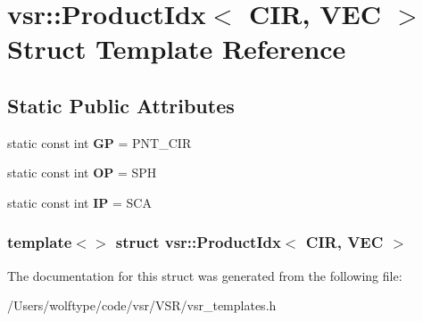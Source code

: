 \hypertarget{structvsr_1_1_product_idx_3_01_c_i_r_00_01_v_e_c_01_4}{\section{vsr\-:\-:Product\-Idx$<$ C\-I\-R, V\-E\-C $>$ Struct Template Reference}
\label{structvsr_1_1_product_idx_3_01_c_i_r_00_01_v_e_c_01_4}
}
\subsection*{Static Public Attributes}
\begin{DoxyCompactItemize}
\item 
\hypertarget{structvsr_1_1_product_idx_3_01_c_i_r_00_01_v_e_c_01_4_a4343ed7230b85b8817c0f0564cc146c5}{static const int {\bfseries G\-P} = P\-N\-T\-\_\-\-C\-I\-R}\label{structvsr_1_1_product_idx_3_01_c_i_r_00_01_v_e_c_01_4_a4343ed7230b85b8817c0f0564cc146c5}

\item 
\hypertarget{structvsr_1_1_product_idx_3_01_c_i_r_00_01_v_e_c_01_4_a7aac08ad5b5fc0d2235f9e57a6109270}{static const int {\bfseries O\-P} = S\-P\-H}\label{structvsr_1_1_product_idx_3_01_c_i_r_00_01_v_e_c_01_4_a7aac08ad5b5fc0d2235f9e57a6109270}

\item 
\hypertarget{structvsr_1_1_product_idx_3_01_c_i_r_00_01_v_e_c_01_4_ad8e1c08395cbdaadb817b6e7abdbae37}{static const int {\bfseries I\-P} = S\-C\-A}\label{structvsr_1_1_product_idx_3_01_c_i_r_00_01_v_e_c_01_4_ad8e1c08395cbdaadb817b6e7abdbae37}

\end{DoxyCompactItemize}
\subsubsection*{template$<$$>$ struct vsr\-::\-Product\-Idx$<$ C\-I\-R, V\-E\-C $>$}



The documentation for this struct was generated from the following file\-:\begin{DoxyCompactItemize}
\item 
/\-Users/wolftype/code/vsr/\-V\-S\-R/vsr\-\_\-templates.\-h\end{DoxyCompactItemize}
